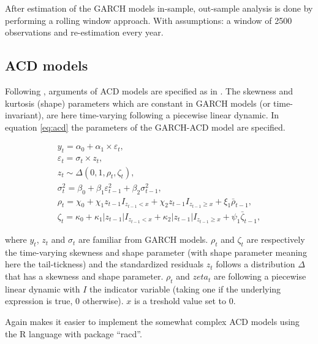 \documentclass[a4paper, twoside]{templates/ociamthesis}
\begin{document}
\noindent After estimation of the GARCH models in-sample, out-sample analysis is done by performing a rolling window approach. With assumptions: a window of 2500 observations and re-estimation every year.

\hypertarget{acd-models-meth}{%
\subsection{ACD models}\label{acd-models-meth}}

\noindent Following \textcite{ghalanos2016}, arguments of ACD models are specified as in \textcite{hansen1994}. The skewness and kurtosis (shape) parameters which are constant in GARCH models (or time-invariant), are here time-varying following a piecewise linear dynamic. In equation \eqref{eq:acd} the parameters of the GARCH-ACD model are specified.

\begin{equation}
\begin{array}{l}
y_{t}=\alpha_0 + \alpha_1 \times \varepsilon_{t}, \\
\varepsilon_{t}= \sigma_{t} \times z_{t}, \\
z_{t} \sim \Delta\left(0,1, \rho_{t}, \zeta_{t}\right), \\
\sigma_{t}^{2}=\beta_0+\beta_{1} \varepsilon_{t-1}^{2}+\beta_{2} \sigma_{t-1}^{2}, \\
\rho_{t}= \chi_{0}+\chi_{1} z_{t-1} I_{z_{t-1}<x}+\chi_{2} z_{t-1} I_{z_{t-1} \geqslant x}+\xi_{1} \bar{\rho}_{t-1},\\
\zeta_{t}=\kappa_{0}+\kappa_{1}\left|z_{t-1}\right| I_{z_{t-1}<x}+\kappa_{2}\left|z_{t-1}\right| I_{z_{t-1} \geqslant x}+\psi_{1} \bar{\zeta}_{t-1},
\end{array}
\label{eq:acd}
\end{equation}

\noindent where \(y_t\), \(z_t\) and \(\sigma_t\) are familiar from GARCH models. \(\rho_t\) and \(\zeta_t\) are respectively the time-varying skewness and shape parameter (with shape parameter meaning here the tail-tickness) and the standardized residuals \(z_t\) follows a distribution \(\Delta\) that has a skewness and shape parameter. \(\rho_t\) and \(zeta_t\) are following a piecewise linear dynamic with \(I\) the indicator variable (taking one if the underlying expression is true, 0 otherwise). \(x\) is a treshold value set to 0.

\noindent Again \textcite{ghalanos2016} makes it easier to implement the somewhat complex ACD models using the R language with package ``racd''.
\end{document}
